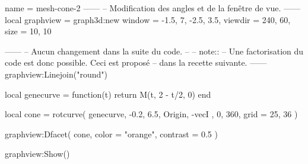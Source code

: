\documentclass[varwidth]{standalone}
\begin{document}
\begin{luadraw}{name = mesh-cone-2}
------
-- Modification des angles et de la fenêtre de vue.
------
local graphview = graph3d:new{
  window  = {-1.5, 7, -2.5, 3.5},
  viewdir = {240, 60},
  size    = {10, 10}
}

------
-- Aucun changement dans la suite du code.
--
-- note::
--     Une factorisation du code est donc possible. Ceci est proposé
--     dans la recette suivante.
------
graphview:Linejoin("round")

local genecurve = function(t)
  return M(t, 2 - t/2, 0)
end

local cone = rotcurve(
  genecurve,
  -0.2, 6.5,
  {
    Origin, -vecI
  },
  0, 360,
  {
    grid = {25, 36}
  })

graphview:Dfacet(
  cone,
  {
    color  = "orange",
    contrast = 0.5
  })

graphview:Show()
\end{luadraw}
\end{document}
